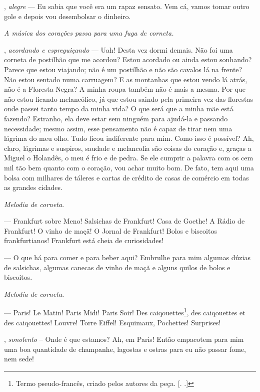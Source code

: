 \begin{myparindent}{0pt}
\begin{Parskip}
, \emph{alegre} --- Eu sabia que você era um rapaz
sensato. Vem cá, vamos tomar outro gole e depois vou desembolsar o
dinheiro.

\emph{A música dos corações passa para uma fuga de corneta.}

, \emph{acordando e espreguiçando} --- Uah! Desta vez
dormi demais. Não foi uma corneta de postilhão que me acordou? Estou
acordado ou ainda estou sonhando? Parece que estou viajando; não é um
postilhão e não são cavalos lá na frente? Não estou sentado numa
carruagem? E as montanhas que estou vendo lá atrás, não é a Floresta
Negra? A minha roupa também não é mais a mesma. Por que não estou
ficando melancólico, já que estou saindo pela primeira vez das florestas
onde passei tanto tempo da minha vida? O que será que a minha mãe está
fazendo? Estranho, ela deve estar sem ninguém para ajudá-la e passando
necessidade; mesmo assim, esse pensamento não é capaz de tirar nem uma
lágrima do meu olho. Tudo ficou indiferente para mim. Como isso é
possível? Ah, claro, lágrimas e suspiros, saudade e melancolia são
coisas do coração e, graças a Miguel o Holandês, o meu é frio e de
pedra. Se ele cumprir a palavra com os cem mil tão bem quanto com o
coração, vou achar muito bom. De fato, tem aqui uma bolsa com milhares
de táleres e cartas de crédito de casas de comércio em todas as grandes
cidades.

\emph{Melodia de corneta}.

 --- Frankfurt sobre Meno! Salsichas de Frankfurt! Casa
de Goethe! A Rádio de Frankfurt! O vinho de maçã! O Jornal de Frankfurt!
Bolos e biscoitos frankfurtianos! Frankfurt está cheia de curiosidades!

 --- O que há para comer e para beber aqui? Embrulhe
para mim algumas dúzias de salsichas, algumas canecas de vinho de maçã e
alguns quilos de bolos e biscoitos.

\emph{Melodia de corneta}.

 --- Paris! Le Matin! Paris Midi! Paris Soir! Des
caiqouettes\footnote{Termo pseudo-francês, criado pelos autores da peça.
  [. .]}, des caiqouettes et des caiqouettes! Louvre! Torre
Eiffel! Esquimaux, Pochettes! Surprises!

, \emph{sonolento} -- Onde é que estamos? Ah, em
Paris! Então empacotem para mim uma boa quantidade de champanhe,
lagostas e ostras para eu não passar fome, nem sede!


\end{Parskip}
\end{myparindent}
